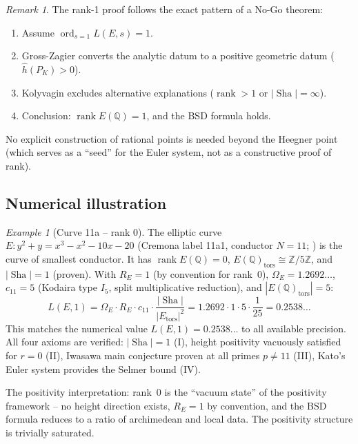\documentclass[aps,prd,twocolumn,superscriptaddress,nofootinbib]{revtex4-2}
\theoremstyle{definition}
\theoremstyle{remark}
\newtheorem{remark}[theorem]{Remark}
\newtheorem{example}[theorem]{Example}
\DeclareMathOperator{\ord}{ord}
\DeclareMathOperator{\rank}{rank}
\DeclareMathOperator{\Sha}{Sha}
\begin{document}
\begin{remark}
The rank-1 proof follows the exact pattern of a No-Go theorem:
\begin{enumerate}
\item Assume $\ord_{s=1} L(E,s) = 1$.
\item Gross-Zagier converts the analytic datum to a positive geometric datum ($\hat{h}(P_K) > 0$).
\item Kolyvagin excludes alternative explanations ($\rank > 1$ or $|\Sha| = \infty$).
\item Conclusion: $\rank E(\mathbb{Q}) = 1$, and the BSD formula holds.
\end{enumerate}
No explicit construction of rational points is needed beyond the Heegner point (which serves as a ``seed'' for the Euler system, not as a constructive proof of rank).
\end{remark}

\subsection{Numerical illustration}

\begin{example}[Curve 11a -- rank 0]
\label{ex:11a}
The elliptic curve $E: y^2 + y = x^3 - x^2 - 10x - 20$ (Cremona label 11a1, conductor $N = 11$; \cite{LMFDB}) is the curve of smallest conductor. It has $\rank E(\mathbb{Q}) = 0$, $E(\mathbb{Q})_{\mathrm{tors}} \cong \mathbb{Z}/5\mathbb{Z}$, and $|\Sha| = 1$ (proven). With $R_E = 1$ (by convention for rank~0), $\Omega_E = 1.2692\ldots$, $c_{11} = 5$ (Kodaira type $I_5$, split multiplicative reduction), and $|E(\mathbb{Q})_{\mathrm{tors}}| = 5$:
\[
  L(E,1) = \Omega_E \cdot R_E \cdot c_{11} \cdot \frac{|\Sha|}{|E_{\mathrm{tors}}|^2}
  = 1.2692 \cdot 1 \cdot 5 \cdot \frac{1}{25} = 0.2538\ldots
\]
This matches the numerical value $L(E,1) = 0.2538\ldots$ to all available precision. All four axioms are verified: $|\Sha| = 1$ (I), height positivity vacuously satisfied for $r = 0$ (II), Iwasawa main conjecture proven at all primes $p \neq 11$ (III), Kato's Euler system provides the Selmer bound (IV).

The positivity interpretation: rank~0 is the ``vacuum state'' of the positivity framework -- no height direction exists, $R_E = 1$ by convention, and the BSD formula reduces to a ratio of archimedean and local data. The positivity structure is trivially saturated.
\end{example}
\end{document}
